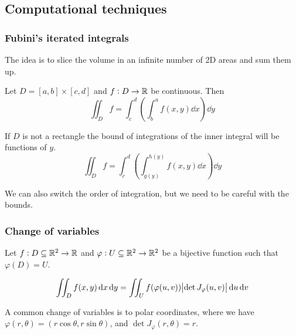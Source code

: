 \documentclass[12pt]{report}
\begin{document}
\subsection{Computational techniques}

\subsubsection{Fubini's iterated integrals}

The idea is to slice the volume in an infinite number of 2D areas and sum them up.

\begin{theorem}[Fubini]
    Let $D = [a, b] \times [c, d]$ and $f: D \to \mathbb{R}$ be continuous.
    Then
    $$
        \iint_D f = \int_c^d \left( \int_{b}^{a} f(x, y) \dd{x} \right) \dd{y}
    $$

    If $D$ is not a rectangle the bound of integrations of the inner integral will be functions of $y$.
    $$
        \iint_D f = \int_{c}^{d} \left( \int_{g(y)}^{h(y)} f(x, y) \dd{x} \right) \dd{y}
    $$
\end{theorem}

\begin{remark}
    We can also switch the order of integration, but we need to be careful with the bounds.
\end{remark}

\subsubsection{Change of variables}

Let $f: D \subseteq \mathbb{R}^2 \to \mathbb{R}$ and $\varphi: U \subseteq \mathbb{R}^2 \to \mathbb{R}^2$ be a bijective function such that $\varphi(D) = U$.

$$
    \iint_D f(x, y) \dd{x} \dd{y} = \iint_U f(\varphi(u, v)) \abs{\det J_{\varphi}(u, v)} \dd{u} \dd{v}
$$

A common change of variables is to polar coordinates, where we have $\varphi(r, \theta) = (r \cos \theta, r \sin \theta)$, and $\det J_{\varphi}(r, \theta) = r$.
\end{document}
